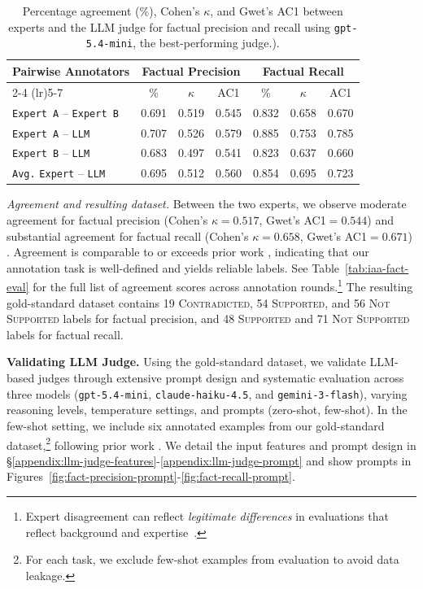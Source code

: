 \documentclass{article}
\newcommand{\xhdr}[1]{%
  \noindent\textbf{#1.}
}
\begin{document}
\begin{table}[t]
\centering
\footnotesize
\caption{
Percentage agreement (\%), Cohen's $\kappa$, and Gwet's AC1 between experts and the LLM judge for factual precision and recall using \texttt{gpt-5.4-mini}, the best-performing judge.).
}
\label{tab:factual-agreement}

\setlength{\tabcolsep}{4pt}

\begin{tabular}{lcccccc}
\toprule
\textbf{Pairwise Annotators} 
& \multicolumn{3}{c}{\textbf{Factual Precision}} 
& \multicolumn{3}{c}{\textbf{Factual Recall}} \\
\cmidrule(lr){2-4} \cmidrule(lr){5-7}
& \% & $\kappa$ & AC1 & \% & $\kappa$ & AC1 \\
\midrule
\texttt{Expert A} -- \texttt{Expert B} 
& 0.691 & 0.519 & 0.545 
& 0.832 & 0.658 & 0.670 \\
\texttt{Expert A} -- \texttt{LLM}
& 0.707 & 0.526 & 0.579 
& 0.885 & 0.753 & 0.785 \\
\texttt{Expert B} -- \texttt{LLM}
& 0.683 & 0.497 & 0.541 
& 0.823 & 0.637 & 0.660 \\
\texttt{Avg.} \texttt{Expert} -- \texttt{LLM}
& 0.695 & 0.512 & 0.560 
& 0.854 & 0.695 & 0.723 \\
\bottomrule
\end{tabular}
\end{table}

\textit{Agreement and resulting dataset.}
Between the two experts, we observe moderate agreement for factual precision (Cohen's $\kappa=0.517$, Gwet's AC1$=0.544$) and substantial agreement for factual recall (Cohen's $\kappa=0.658$, Gwet's AC1$=0.671$) \cite{8d20e0b8-89d8-3d65-bcf5-8c19d56ec4ab}. 
Agreement is comparable to or exceeds prior work \cite{cheng2025facts, liu-etal-2025-verifact, min-etal-2023-factscore}, indicating that our annotation task is well-defined and yields reliable labels. See Table~\ref{tab:iaa-fact-eval} for the full list of agreement scores across annotation rounds.\footnote{Expert disagreement can reflect \textit{legitimate differences} in evaluations that reflect background and expertise~\cite{hwang2026deepresearchshallowevaluation}.} The resulting gold-standard dataset contains 19 \textsc{Contradicted}, 54 \textsc{Supported}, and 56 \textsc{Not Supported} labels for factual precision, and 48 \textsc{Supported} and 71 \textsc{Not Supported} labels for factual recall.

\xhdr{Validating LLM Judge} Using the gold-standard dataset, we validate LLM-based judges through extensive prompt design and systematic evaluation across three models (\texttt{gpt-5.4-mini}, \texttt{claude-haiku-4.5}, and \texttt{gemini-3-flash}), varying reasoning levels, temperature settings, and prompts (zero-shot, few-shot). In the few-shot setting, we include six annotated examples from our gold-standard dataset,\footnote{For each task, we exclude few-shot examples from evaluation to avoid data leakage.} following prior work \cite{Mittal_Jung_ElSherief_Mitra_De_Choudhury_2025}. We detail the input features and prompt design in \S\ref{appendix:llm-judge-features}-\ref{appendix:llm-judge-prompt} and show prompts in Figures~\ref{fig:fact-precision-prompt}-\ref{fig:fact-recall-prompt}. 
\end{document}
